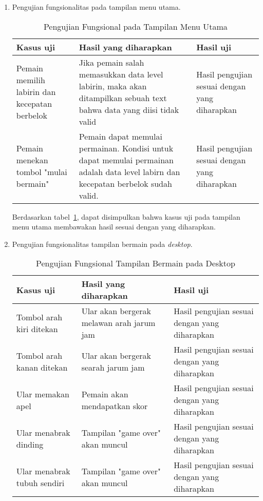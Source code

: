 \begin{enumerate}
	\item Pengujian fungsionalitas pada tampilan menu utama.
	
	\begin{table}[H]
		\caption{Pengujian Fungsional pada Tampilan Menu Utama} \label{tab:table1}
		\begin{tabular}{| m{4cm} | m{6cm}  | m{4cm} |}
			\hline
			Kasus uji & Hasil yang diharapkan & Hasil uji \\ \hline
			Pemain memilih labirin dan kecepatan berbelok & Jika pemain salah memasukkan data level labirin, maka akan ditampilkan sebuah text bahwa data yang diisi tidak valid & Hasil pengujian sesuai dengan yang diharapkan\\ \hline
			Pemain menekan tombol "mulai bermain" & Pemain dapat memulai permainan. Kondisi untuk dapat memulai permainan adalah data level labirn dan kecepatan berbelok sudah valid. & Hasil pengujian sesuai dengan yang diharapkan\\ \hline
		\end{tabular}
	\end{table}
	
	Berdasarkan tabel~\ref{tab:table1}, dapat disimpulkan bahwa kasus uji pada tampilan menu utama membawakan hasil sesuai dengan yang diharapkan. 
	
	\item Pengujian fungsionalitas tampilan bermain pada \textit{desktop}.
	
	\begin{table}[H]
		\caption{Pengujian Fungsional Tampilan Bermain pada Desktop} \label{tab:table2}
		\begin{tabular}{| m{4cm} | m{6cm}  | m{4cm} |}
			\hline
			Kasus uji & Hasil yang diharapkan & Hasil uji \\ \hline
			Tombol arah kiri ditekan & Ular akan bergerak melawan arah jarum jam & Hasil pengujian sesuai dengan yang diharapkan\\ \hline
			Tombol arah kanan ditekan & Ular akan bergerak searah jarum jam & Hasil pengujian sesuai dengan yang diharapkan\\ \hline
			Ular memakan apel & Pemain akan mendapatkan skor & Hasil pengujian sesuai dengan yang diharapkan\\ \hline
			Ular menabrak dinding & Tampilan "game over" akan muncul & Hasil pengujian sesuai dengan yang diharapkan\\ \hline
			Ular menabrak tubuh sendiri & Tampilan "game over" akan muncul & Hasil pengujian sesuai dengan yang diharapkan\\ \hline 
		\end{tabular}
	\end{table}
	

\end{enumerate}
